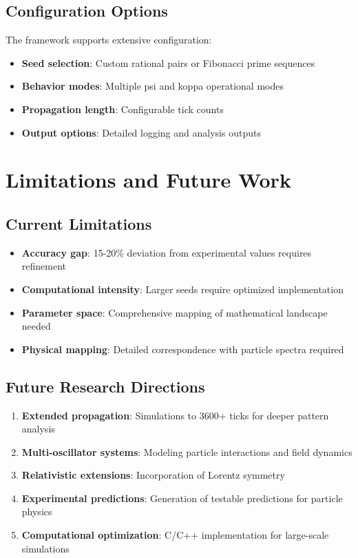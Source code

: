 \documentclass[12pt]{article}
\begin{document}
\subsection{Configuration Options}

The framework supports extensive configuration:

\begin{itemize}
\item \textbf{Seed selection}: Custom rational pairs or Fibonacci prime sequences
\item \textbf{Behavior modes}: Multiple psi and koppa operational modes
\item \textbf{Propagation length}: Configurable tick counts
\item \textbf{Output options}: Detailed logging and analysis outputs
\end{itemize}

\section{Limitations and Future Work}

\subsection{Current Limitations}

\begin{itemize}
\item \textbf{Accuracy gap}: 15-20\% deviation from experimental values requires refinement
\item \textbf{Computational intensity}: Larger seeds require optimized implementation
\item \textbf{Parameter space}: Comprehensive mapping of mathematical landscape needed
\item \textbf{Physical mapping}: Detailed correspondence with particle spectra required
\end{itemize}

\subsection{Future Research Directions}

\begin{enumerate}
\item \textbf{Extended propagation}: Simulations to 3600+ ticks for deeper pattern analysis
\item \textbf{Multi-oscillator systems}: Modeling particle interactions and field dynamics
\item \textbf{Relativistic extensions}: Incorporation of Lorentz symmetry
\item \textbf{Experimental predictions}: Generation of testable predictions for particle physics
\item \textbf{Computational optimization}: C/C++ implementation for large-scale simulations
\end{enumerate}
\end{document}
